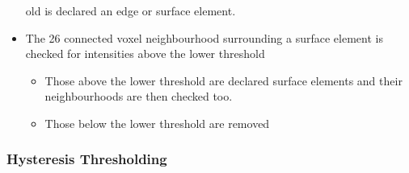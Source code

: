 \documentclass[9pt]{beamer}
\begin{document}
\begin{frame}
\begin{itemize}
old is declared an edge or surface element. 
							\item The 26 connected voxel neighbourhood surrounding a surface element is checked for intensities above the lower threshold
								\begin{itemize}
									\item Those above the lower threshold are declared  surface elements and their neighbourhoods are then checked too.
									\item Those below the lower threshold are removed
								\end{itemize}			
						\end{itemize}
				

	\end{frame}
			\begin{frame}
			\frametitle{Hysteresis Thresholding}
				

\end{frame}
\end{document}
